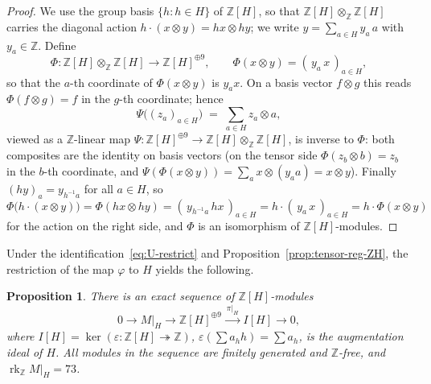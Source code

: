 \documentclass[12pt,a4paper]{article}
\newtheorem{proposition}[theorem]{Proposition}
\theoremstyle{definition}
\DeclareMathOperator{\rk}{rk}
\begin{document}
\begin{proof}
We use the group basis \(\{h : h \in H\}\) of \(\mathbb{Z}[H]\), so
that \(\mathbb{Z}[H] \otimes_{\mathbb{Z}} \mathbb{Z}[H]\) carries the
diagonal action \(h \cdot (x \otimes y) = hx \otimes hy\); we write
\(y = \sum_{a \in H} y_a\, a\) with \(y_a \in \mathbb{Z}\).  Define
\[
\Phi : \mathbb{Z}[H] \otimes_{\mathbb{Z}} \mathbb{Z}[H]
\longrightarrow \mathbb{Z}[H]^{\oplus 9}, \qquad
\Phi(x \otimes y) = (\,y_a\, x\,)_{a \in H},
\]
so that the \(a\)-th coordinate of \(\Phi(x \otimes y)\) is \(y_a x\).
On a basis vector \(f \otimes g\) this reads \(\Phi(f \otimes g) = f\)
in the \(g\)-th coordinate; hence
\[
\Psi\bigl((z_a)_{a \in H}\bigr) \;=\; \sum_{a \in H} z_a \otimes a ,
\]
viewed as a \(\mathbb{Z}\)-linear map
\(\Psi : \mathbb{Z}[H]^{\oplus 9} \to
\mathbb{Z}[H] \otimes_{\mathbb{Z}} \mathbb{Z}[H]\), is inverse to
\(\Phi\): both composites are the identity on basis vectors
(on the tensor side \(\Phi(z_b \otimes b) = z_b\) in the \(b\)-th
coordinate, and \(\Psi(\Phi(x \otimes y)) = \sum_a x \otimes (y_a a)
= x \otimes y\)).  Finally \((hy)_a = y_{h^{-1}a}\) for all
\(a \in H\), so
\[
\Phi\bigl(h \cdot (x \otimes y)\bigr) = \Phi(hx \otimes hy)
= (\,y_{h^{-1}a}\, hx\,)_{a \in H}
= h \cdot (\,y_a\, x\,)_{a \in H}
= h \cdot \Phi(x \otimes y)
\]
for the action on the right side, and \(\Phi\) is an isomorphism
of \(\mathbb{Z}[H]\)-modules.
\end{proof}

Under the identification~\eqref{eq:U-restrict} and
Proposition~\ref{prop:tensor-reg-ZH},
the restriction of the map \(\varphi\) to \(H\) yields the following.

\begin{proposition}\label{prop:procesi-H}
There is an exact sequence of \(\mathbb{Z}[H]\)-modules
\begin{equation}
0 \longrightarrow M|_H \longrightarrow \mathbb{Z}[H]^{\oplus 9}
\xrightarrow{\ \pi|_H\ } I[H] \longrightarrow 0 ,
\end{equation}
where \(I[H] = \ker(\varepsilon : \mathbb{Z}[H] \twoheadrightarrow
\mathbb{Z})\), \(\varepsilon(\sum a_h h) = \sum a_h\), is the augmentation ideal
of \(H\). All modules in the sequence are finitely generated and
\(\mathbb{Z}\)-free, and \(\rk_{\mathbb{Z}} M|_H = 73\).
\end{proposition}
\end{document}
